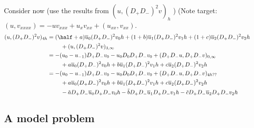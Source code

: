 Consider now (use the results from $(u,(D_+D_-)^2 v)_{h}$ )
(Note target: $(u,v_{xxxx})= -u v_{xxx} + u_x v_{xx} + (u_{xx},v_{xx})$. 
\begin{align*}
  (u,(D_+D_-)^2 v)_{4h} & =
     (\half+a)\ubar_0 (D_+D_-)^2 v_0 h + (1+b)\ubar_1 (D_+D_-)^2 v_1 h + (1+c)\ubar_2 (D_+D_-)^2 v_2 h \\
            &   ~~~~~~~+ (u,(D_+D_-)^2 v)_{3,\infty}\\
    &= - (u_0-u_{-1}) D_+D_-v_0 - u_0 D_0 D_+D_- v_0+ (D_+D_-u,D_+D_-v)_{0,\infty} \\
    &   ~~~~~~~+ a\ubar_0 (D_+D_-)^2 v_0 h + b\ubar_1 (D_+D_-)^2 v_1 h + c\ubar_2 (D_+D_-)^2 v_2 h \\
     &= - (u_0-u_{-1}) D_+D_- v_0 - u_0 D_0 D_+D_- v_0+ (D_+D_-u,D_+D_-v)_{4h??} \\
    &   ~~~~~~~+ a\ubar_0 (D_+D_-)^2 v_0 h + b\ubar_1 (D_+D_-)^2 v_1 h + c\ubar_2 (D_+D_-)^2 v_2 h \\
   &   ~~~~~~~ - \ac D_+D_- \ubar_0 D_+D_- v_0 h - \bc D_+D_- \ubar_1 D_+D_- v_1 h - \cc D_+D_- \ubar_2 D_+D_- v_2 h
\end{align*}



\clearpage
\subsection{A model problem}
\newcommand{\vb}{\bar{v}}

